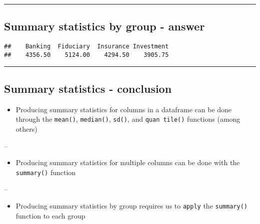 \documentclass[]{article}
\newenvironment{Shaded}{\begin{snugshade}}{\end{snugshade}}
\newcommand{\KeywordTok}[1]{\textcolor[rgb]{0.13,0.29,0.53}{\textbf{#1}}}
\newcommand{\NormalTok}[1]{#1}
\newcommand{\OperatorTok}[1]{\textcolor[rgb]{0.81,0.36,0.00}{\textbf{#1}}}
\providecommand{\tightlist}{%
  \setlength{\itemsep}{0pt}\setlength{\parskip}{0pt}}
\begin{document}
\begin{center}\rule{0.5\linewidth}{\linethickness}\end{center}

\hypertarget{summary-statistics-by-group---answer}{%
\subsection{Summary statistics by group -
answer}\label{summary-statistics-by-group---answer}}

\begin{Shaded}
\end{Shaded}

\begin{verbatim}
##    Banking  Fiduciary  Insurance Investment 
##    4356.50    5124.00    4294.50    3905.75
\end{verbatim}

\begin{center}\rule{0.5\linewidth}{\linethickness}\end{center}

\hypertarget{summary-statistics---conclusion}{%
\subsection{Summary statistics -
conclusion}\label{summary-statistics---conclusion}}

\begin{itemize}
\tightlist
\item
  Producing summary statistics for columns in a dataframe can be done
  through the \texttt{mean()}, \texttt{median()}, \texttt{sd()}, and
  \texttt{quan\ tile()} functions (among others)
\end{itemize}

--

\begin{itemize}
\tightlist
\item
  Producing summary statistics for multiple columns can be done with the
  \texttt{summary()} function
\end{itemize}

--

\begin{itemize}
\tightlist
\item
  Producing summary statistics by group requires us to \texttt{apply}
  the \texttt{summary()} function to each group
\end{itemize}
\end{document}
